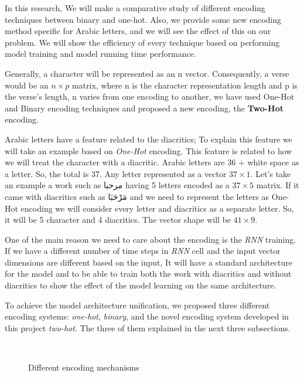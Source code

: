 In this research, We will make a comparative study of different encoding techniques between binary and one-hot. Also, we provide some new encoding method specific for Arabic letters, and we will see the effect of this on our problem. We will show the efficiency of every technique based on performing model training and model running time performance.

Generally, a character will be represented as an n vector. Consequently, a verse would be an $n \times p$ matrix, where n is the character representation length and p is the verse’s length, n varies from one encoding to another, we have used One-Hot and Binary encoding techniques and proposed a new encoding, the \textbf{Two-Hot} encoding.

Arabic letters have a feature related to the diacritics; To explain this feature we will take an example based on \textit{One-Hot} encoding. This feature is related to how we will treat the character with a diacritic. Arabic letters are 36 + white space as a letter. So, the total is 37. Any letter represented as a vector $37 \times 1$. Let's take an example a work such as \textarabic{مرحبا} having 5 letters encoded as a $37 \times 5$ matrix. If it came with diacritics such as \textarabic{مَرْحَبَا} and we need to represent the letters as One-Hot encoding we will consider every letter and diacritics as a separate letter. So, it will be 5 character and 4 diacritics. The vector shape will be $41 \times 9$.

One of the main reason we need to care about the encoding is the \textit{RNN} training. If we have a different number of time steps in \textit{RNN} cell and the input vector dimensions are different based on the input, It will have a standard architecture for the model and to be able to train both the work with diacritics and without diacritics to show the effect of the model learning on the same architecture.

To achieve the model architecture unification,  we proposed three different encoding systems: \textit{one-hot}, \textit{binary}, and the novel encoding system developed in this project \textit{two-hot}. The three of them explained in the next three subsections.

\begin{figure}[!t]
  \centering
  
  \caption{Different encoding mechanisms%
  }~\label{Fig:One_Binary_Encoding}
\end{figure}



